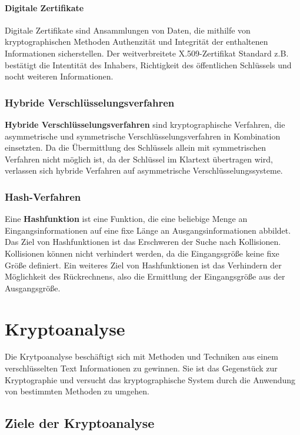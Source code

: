 \documentclass[12pt,a4paper]{report}
\begin{document}
\begin{onehalfspace}
\paragraph{Digitale Zertifikate}

Digitale Zertifikate sind Ansammlungen von Daten, die mithilfe von kryptographischen Methoden Authenzität und Integrität der enthaltenen Informationen sicherstellen. Der weitverbreitete X.509-Zertifikat Standard z.B. bestätigt die Intentität des Inhabers, Richtigkeit des öffentlichen Schlüssels und nocht weiteren Informationen.

\subsubsection{Hybride Verschlüsselungsverfahren}

\textbf{Hybride Verschlüsselungsverfahren} sind kryptographische Verfahren, die asymmetrische und symmetrische Verschlüsselungsverfahren in Kombination einsetzten. Da die Übermittlung des Schlüssels allein mit symmetrischen Verfahren nicht möglich ist, da der Schlüssel im Klartext übertragen wird, verlassen sich hybride Verfahren auf asymmetrische Verschlüsselungssysteme.

\subsubsection{Hash-Verfahren}

Eine \textbf{Hashfunktion} ist eine Funktion, die eine beliebige Menge an Eingangsinformationen auf eine fixe Länge an Ausgangsinformationen abbildet.  Das Ziel von Hashfunktionen ist das Erschweren der Suche nach Kollisionen. Kollisionen können nicht verhindert werden, da die Eingangsgröße keine fixe Größe definiert. Ein weiteres Ziel von Hashfunktionen ist das Verhindern der Möglichkeit des Rückrechnens, also die Ermittlung der Eingangsgröße aus der Ausgangsgröße.\cite{wiki04}

\newpage
\section{Kryptoanalyse}

Die Krytpoanalyse beschäftigt sich mit Methoden und Techniken aus einem verschlüsselten Text Informationen zu gewinnen. Sie ist das Gegenstück zur Kryptographie und versucht das kryptographische System durch die Anwendung von bestimmten Methoden zu umgehen.

\subsection{Ziele der Kryptoanalyse}


\end{onehalfspace}
\end{document}
